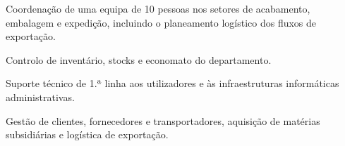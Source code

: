 \begin{itens}
  \item Coordenação de uma equipa de 10 pessoas nos setores de acabamento, embalagem e expedição, incluindo o planeamento logístico dos fluxos de exportação.
  \item Controlo de inventário, stocks e economato do departamento.
  \item Suporte técnico de 1.ª linha aos utilizadores e às infraestruturas informáticas administrativas.
\end{itens}

\begin{itens}
  \item Gestão de clientes, fornecedores e transportadores, aquisição de matérias subsidiárias e logística de exportação.
\end{itens}
